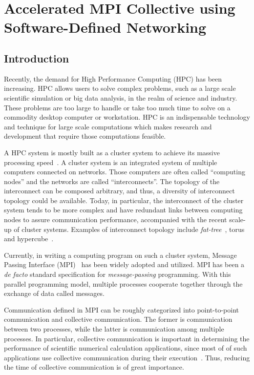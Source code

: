 \chapter{Accelerated MPI Collective using Software-Defined Networking}\label{sec:iii}

\section{Introduction}\label{sec:iii-introduction}

Recently, the demand for High Performance Computing (HPC) has been
increasing. HPC allows users to solve complex problems, such as a large
scale scientific simulation or big data analysis, in the realm of
science and industry. These problems are too large to handle or take too
much time to solve on a commodity desktop computer or workstation. HPC
is an indispensable technology and technique for large scale
computations which makes research and development that require those
computations feasible.

A HPC system is mostly built as a cluster system to achieve its massive
processing speed~\autocite{top500}. A cluster system is an integrated system
of multiple computers connected on networks. Those computers are often
called ``computing nodes'' and the networks are called
``interconnects''. The topology of the interconnect can be composed
arbitrary, and thus, a diversity of interconnect topology could be
available. Today, in particular, the interconnect of the cluster system
tends to be more complex and have redundant links between computing
nodes to assure communication performance, accompanied with the recent
scale-up of cluster systems. Examples of interconnect topology include
\emph{fat-tree}~\autocite{Leiserson1985}, torus~\autocite{Adiga2005} and
hypercube~\autocite{Dally2003}.

Currently, in writing a computing program on such a cluster system, Message
Passing Interface (MPI)~\autocite{Gropp1999,MessagePassingInterfaceForum2012} has
been widely adopted and utilized. MPI has been a \emph{de facto} standard
specification for \emph{message-passing} programming. With this parallel
programming model, multiple processes cooperate together through the exchange
of data called messages.

Communication defined in MPI can be roughly categorized into
point-to-point communication and collective communication. The former is
communication between two processes, while the latter is communication
among multiple processes. In particular, collective communication is
important in determining the performance of scientific numerical
calculation applications, since most of of such applications use
collective communication during their execution~\autocite{Rabenseifner2000}.
Thus, reducing the time of collective communication is of great
importance.

